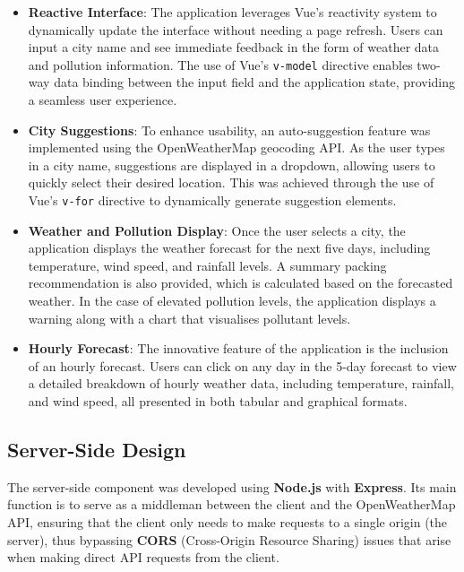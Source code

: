 \documentclass{article}
\begin{document}
\begin{itemize}
    \item \textbf{Reactive Interface}: The application leverages Vue's reactivity system to dynamically update the interface without needing a page refresh. Users can input a city name and see immediate feedback in the form of weather data and pollution information. The use of Vue's \texttt{v-model} directive enables two-way data binding between the input field and the application state, providing a seamless user experience.
    
    \item \textbf{City Suggestions}: To enhance usability, an auto-suggestion feature was implemented using the OpenWeatherMap geocoding API. As the user types in a city name, suggestions are displayed in a dropdown, allowing users to quickly select their desired location. This was achieved through the use of Vue's \texttt{v-for} directive to dynamically generate suggestion elements.

    \item \textbf{Weather and Pollution Display}: Once the user selects a city, the application displays the weather forecast for the next five days, including temperature, wind speed, and rainfall levels. A summary packing recommendation is also provided, which is calculated based on the forecasted weather. In the case of elevated pollution levels, the application displays a warning along with a chart that visualises pollutant levels.

    \item \textbf{Hourly Forecast}: The innovative feature of the application is the inclusion of an hourly forecast. Users can click on any day in the 5-day forecast to view a detailed breakdown of hourly weather data, including temperature, rainfall, and wind speed, all presented in both tabular and graphical formats.
\end{itemize}

\subsection*{Server-Side Design}

The server-side component was developed using \textbf{Node.js} with \textbf{Express}. Its main function is to serve as a middleman between the client and the OpenWeatherMap API, ensuring that the client only needs to make requests to a single origin (the server), thus bypassing \textbf{CORS} (Cross-Origin Resource Sharing) issues that arise when making direct API requests from the client.
\end{document}
